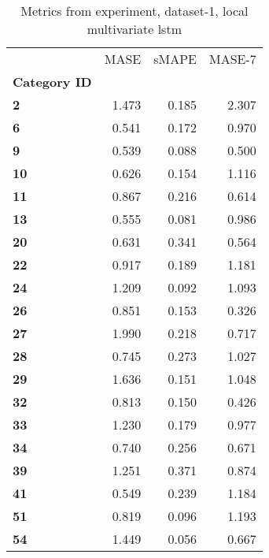 \begin{table}[h]
\centering
\caption{Metrics from experiment, dataset-1, local multivariate lstm}
\label{table:local-multivariate-lstm-dataset-1}
\begin{tabular}{lrrr}
\toprule
{} &   MASE &  sMAPE &  MASE-7 \\
\textbf{Category ID} &        &        &         \\
\midrule
\textbf{2          } &  1.473 &  0.185 &   2.307 \\
\textbf{6          } &  0.541 &  0.172 &   0.970 \\
\textbf{9          } &  0.539 &  0.088 &   0.500 \\
\textbf{10         } &  0.626 &  0.154 &   1.116 \\
\textbf{11         } &  0.867 &  0.216 &   0.614 \\
\textbf{13         } &  0.555 &  0.081 &   0.986 \\
\textbf{20         } &  0.631 &  0.341 &   0.564 \\
\textbf{22         } &  0.917 &  0.189 &   1.181 \\
\textbf{24         } &  1.209 &  0.092 &   1.093 \\
\textbf{26         } &  0.851 &  0.153 &   0.326 \\
\textbf{27         } &  1.990 &  0.218 &   0.717 \\
\textbf{28         } &  0.745 &  0.273 &   1.027 \\
\textbf{29         } &  1.636 &  0.151 &   1.048 \\
\textbf{32         } &  0.813 &  0.150 &   0.426 \\
\textbf{33         } &  1.230 &  0.179 &   0.977 \\
\textbf{34         } &  0.740 &  0.256 &   0.671 \\
\textbf{39         } &  1.251 &  0.371 &   0.874 \\
\textbf{41         } &  0.549 &  0.239 &   1.184 \\
\textbf{51         } &  0.819 &  0.096 &   1.193 \\
\textbf{54         } &  1.449 &  0.056 &   0.667 \\
\bottomrule
\end{tabular}
\end{table}
